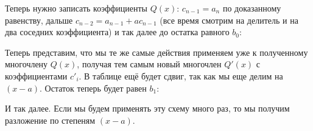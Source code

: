 \documentclass[russian]{lecture-notes}
\theoremstyle{definition}
\begin{document}
    Теперь нужно записать коэффициенты $Q(x)$: $c_{n-1} = a_{n}$ по доказанному равенству, дальше $c_{n-2} = a_{n-1} + ac_{n-1}$ (все время смотрим на делитель и на два соседних коэффициента) и так далее до остатка равного $b_0$:
    \begin{table}[H]
        \centering
    \end{table}

    Теперь представим, что мы те же самые действия применяем уже к полученному многочлену $Q(x)$, получая тем самым новый многочлен $Q'(x)$ с коэффициентами $c'_i$. В таблице ещё будет сдвиг, так как мы еще делим на $(x-a)$. Остаток теперь будет равен $b_1$:

    \begin{table}[H]
        \centering
    \end{table}

    И так далее. Если мы будем применять эту схему много раз, то мы получим разложение по степеням $(x-a)$.
\end{document}
